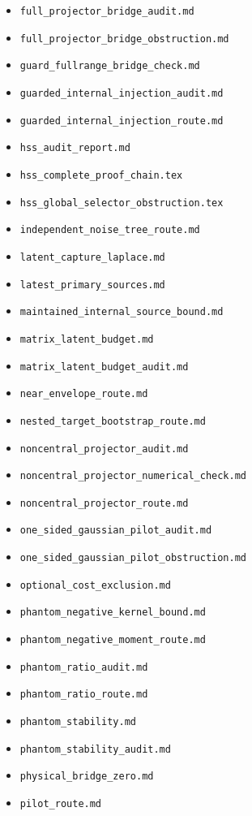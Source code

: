 \documentclass[11pt,oneside,openany,a4paper]{book}
\numberwithin{equation}{chapter}
\theoremstyle{definition}
\theoremstyle{remark}
\newcommand{\sourcefile}[1]{{\small\nolinkurl{#1}}}
\begin{document}
\begin{itemize}[leftmargin=1.2em,itemsep=1pt,topsep=3pt]
\item \sourcefile{full_projector_bridge_audit.md}
\item \sourcefile{full_projector_bridge_obstruction.md}
\item \sourcefile{guard_fullrange_bridge_check.md}
\item \sourcefile{guarded_internal_injection_audit.md}
\item \sourcefile{guarded_internal_injection_route.md}
\item \sourcefile{hss_audit_report.md}
\item \sourcefile{hss_complete_proof_chain.tex}
\item \sourcefile{hss_global_selector_obstruction.tex}
\item \sourcefile{independent_noise_tree_route.md}
\item \sourcefile{latent_capture_laplace.md}
\item \sourcefile{latest_primary_sources.md}
\item \sourcefile{maintained_internal_source_bound.md}
\item \sourcefile{matrix_latent_budget.md}
\item \sourcefile{matrix_latent_budget_audit.md}
\item \sourcefile{near_envelope_route.md}
\item \sourcefile{nested_target_bootstrap_route.md}
\item \sourcefile{noncentral_projector_audit.md}
\item \sourcefile{noncentral_projector_numerical_check.md}
\item \sourcefile{noncentral_projector_route.md}
\item \sourcefile{one_sided_gaussian_pilot_audit.md}
\item \sourcefile{one_sided_gaussian_pilot_obstruction.md}
\item \sourcefile{optional_cost_exclusion.md}
\item \sourcefile{phantom_negative_kernel_bound.md}
\item \sourcefile{phantom_negative_moment_route.md}
\item \sourcefile{phantom_ratio_audit.md}
\item \sourcefile{phantom_ratio_route.md}
\item \sourcefile{phantom_stability.md}
\item \sourcefile{phantom_stability_audit.md}
\item \sourcefile{physical_bridge_zero.md}
\item \sourcefile{pilot_route.md}

\end{itemize}
\end{document}
